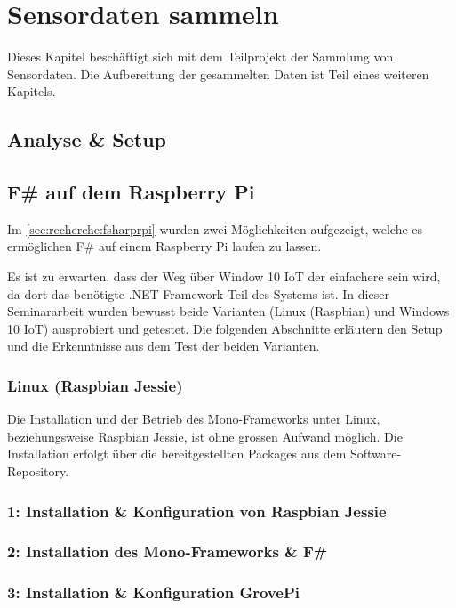 
\chapter{Sensordaten sammeln}
Dieses Kapitel beschäftigt sich mit dem Teilprojekt der Sammlung von Sensordaten. Die Aufbereitung der gesammelten Daten ist Teil eines weiteren Kapitels.


\section{Analyse \& Setup}
\section{F\# auf dem Raspberry Pi}
Im \cref{sec:recherche:fsharprpi}  wurden zwei Möglichkeiten aufgezeigt, welche es ermöglichen F\# auf einem Raspberry Pi laufen zu lassen.

Es ist zu erwarten, dass der Weg über Window 10 IoT der einfachere sein wird, da dort das benötigte .NET Framework Teil des Systems ist. In dieser Seminararbeit wurden bewusst beide Varianten (Linux (Raspbian) und Windows 10 IoT) ausprobiert und getestet. Die folgenden Abschnitte erläutern den Setup und die Erkenntnisse aus dem Test der beiden Varianten. 

\subsection{Linux (Raspbian Jessie)}
Die Installation und der Betrieb des Mono-Frameworks unter Linux, beziehungsweise Raspbian Jessie, ist ohne grossen Aufwand möglich. Die Installation erfolgt über die bereitgestellten Packages aus dem Software-Repository.

\subsection{1: Installation \& Konfiguration von Raspbian Jessie}

\subsection{2: Installation des Mono-Frameworks \& F\#}

\subsection{3: Installation \& Konfiguration GrovePi}


